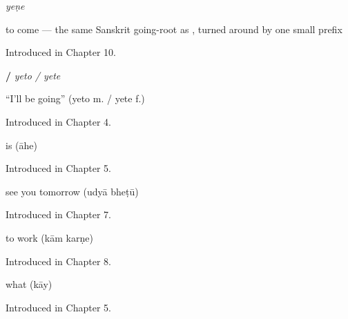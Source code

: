 \noindent\begin{minipage}[t]{\linewidth}
\raggedright
\textbf{}\enspace\emph{yeṇe}\par
\small to come — the same Sanskrit going-root as , turned around by one small prefix\par
\footnotesize Introduced in Chapter 10.
\end{minipage}\par\medskip

\noindent\begin{minipage}[t]{\linewidth}
\raggedright
\textbf{ / }\enspace\emph{yeto / yete}\par
\small \textquotedblleft{}I'll be going\textquotedblright{} (yeto m. / yete f.)\par
\footnotesize Introduced in Chapter 4.
\end{minipage}\par\medskip

\noindent\begin{minipage}[t]{\linewidth}
\raggedright
\textbf{}\par
\small is (āhe)\par
\footnotesize Introduced in Chapter 5.
\end{minipage}\par\medskip

\noindent\begin{minipage}[t]{\linewidth}
\raggedright
\textbf{ }\par
\small see you tomorrow (udyā bheṭū)\par
\footnotesize Introduced in Chapter 7.
\end{minipage}\par\medskip

\noindent\begin{minipage}[t]{\linewidth}
\raggedright
\textbf{ }\par
\small to work (kām karṇe)\par
\footnotesize Introduced in Chapter 8.
\end{minipage}\par\medskip

\noindent\begin{minipage}[t]{\linewidth}
\raggedright
\textbf{}\par
\small what (kāy)\par
\footnotesize Introduced in Chapter 5.
\end{minipage}\par\medskip

